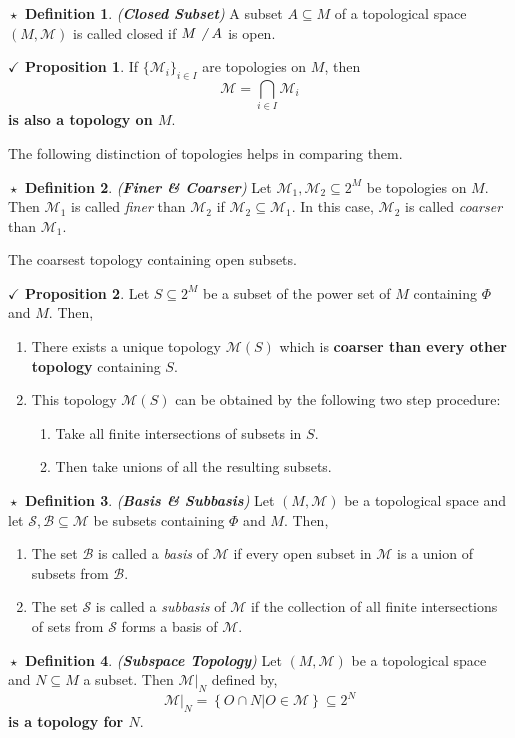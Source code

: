\documentclass{article}
\theoremstyle{definition}
\newtheorem{definition}{$\boxed{\star}$ Definition}
\newcommand{\tit}[1]{\textit{#1}}
\theoremstyle{remark}
\theoremstyle{definition}
\theoremstyle{definition}
\newtheorem{proposition}{$\checkmark$ Proposition}
\newcommand{\topo}[1]{\mathcal{#1}}
\begin{document}
\hrulefill
\begin{definition}
	\tit{(\textbf{Closed Subset})} A subset $ A\subseteq M $ of a topological space $ (M,\topo{M}) $ is called closed if $ M \not \;\; A $ is open.
\end{definition}
\hrulefill
\begin{proposition}
	If $ \{\mathcal{M}_i\}_{i\in I} $ are topologies on $ M $, then 
	\[\mathcal{M} = \bigcap_{i\in I} \mathcal{M}_i\]
	\textbf{is also a topology on $ M $}.
\end{proposition}
\hrulefill
The following distinction of topologies helps in comparing them.
\begin{definition}
	\tit{(\textbf{Finer \& Coarser})} Let $ \topo{M}_1, \topo{M}_2 \subseteq 2^M$ be topologies on $ M $. Then $ \topo{M}_1 $ is called \tit{finer} than $ \topo{M}_2 $ if $ \topo{M}_2 \subseteq \topo{M}_1 $. In this case, $ \topo{M}_2 $ is called \tit{coarser} than $ \topo{M}_1 $. 
\end{definition}
\hrulefill
The coarsest topology containing open subsets.
\begin{proposition}
	Let $ S \subseteq 2^M $ be a subset of the power set of $ M $ containing $ \Phi $ and $ M $. Then,
	\begin{enumerate}
		\item{There exists a unique topology $ \topo{M}(S) $ which is \textbf{coarser than every other topology} containing $ S $.}
		\item{This topology $ \topo{M}(S) $ can be obtained by the following two step procedure:
	\begin{enumerate}
		\item{Take all finite intersections of subsets in $ S $.}
		\item{Then take unions of all the resulting subsets.}
	\end{enumerate}	
	}
	\end{enumerate}
\end{proposition}
\hrulefill
\begin{definition}
	\tit{(\textbf{Basis \& Subbasis})} Let $ (M,\topo{M}) $ be a topological space and let $ \topo{S},\topo{B} \subseteq \topo{M} $ be subsets containing $ \Phi $ and $ M $. Then,
	\begin{enumerate}
		\item{The set $ \topo{B} $ is called a \textit{basis} of $ \topo{M} $ if every open subset in $ \topo{M} $ is a union of subsets from $ \topo{B} $.}
		\item{The set $ \topo{S} $ is called a \textit{subbasis} of $ \topo{M} $ if the collection of all finite intersections of sets from $ \topo{S} $ forms a basis of $ \topo{M} $.}
	\end{enumerate}
\end{definition}
\hrulefill
\begin{definition}
	\tit{(\textbf{Subspace Topology})} Let $ (M,\topo{M}) $ be a topological space and $ N\subseteq M $ a subset. Then $ \left.\topo{M}\right\vert_N $ defined by,
	\[\left .\topo{M}\right\vert_N = \left \{O \cap N \vert O \in \topo{M}\right \}\subseteq 2^N\]
	\textbf{is a topology for $ N $}.
\end{definition}
\hrulefill
\end{document}
